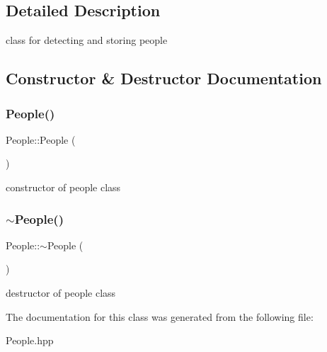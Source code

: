 \subsection{Detailed Description}
class for detecting and storing people 

\subsection{Constructor \& Destructor Documentation}
\mbox{\label{class_people_aae1408eddfd15a5007003ecdf1507941}} 
\subsubsection{\texorpdfstring{People()}{People()}}
{\footnotesize\ttfamily People\+::\+People (\begin{DoxyParamCaption}{ }\end{DoxyParamCaption})}

constructor of people class \mbox{\label{class_people_adae124857f64dadff4e1801410b3dab2}} 
\subsubsection{\texorpdfstring{$\sim$\+People()}{~People()}}
{\footnotesize\ttfamily People\+::$\sim$\+People (\begin{DoxyParamCaption}{ }\end{DoxyParamCaption})}

destructor of people class 

The documentation for this class was generated from the following file\+:\begin{DoxyCompactItemize}
\item 
People.\+hpp\end{DoxyCompactItemize}
